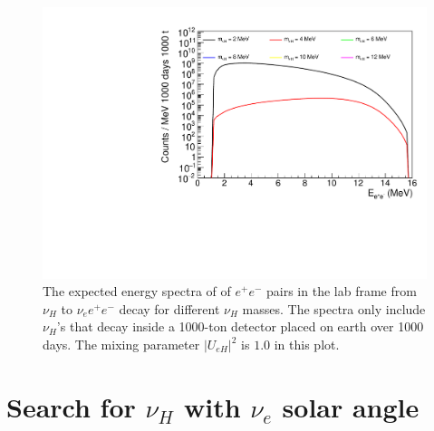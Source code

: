 \documentclass[%
 reprint,
 amsmath,amssymb,
 aps,
 prd,
floatfix,
twocolumn,
]{revtex4-1}
\begin{document}
\begin{figure}[!htbp]
\includegraphics[width=0.99\columnwidth]{../plots/EeeSpectrum_decay_in_detector_integrate_U1.0_AllMass_linXlogY.pdf}
\caption{The expected energy spectra of of $e^+e^-$ pairs in the lab frame from $\nu_H$ to $\nu_e e^+ e^-$ decay for  different $\nu_H$ masses. 
The spectra only include $\nu_H$'s that decay inside a 1000-ton detector placed on earth over 1000 days. 
The mixing parameter $|U_{eH}|^2$ is  $1.0$ in this plot.}
\label{fig:EeeSpectrum_in_detector_U1em0} 
\end{figure}

\clearpage
\section{\label{sec:NueAngle} Search for $\nu_H$ with $\nu_e$ solar angle}
\end{document}
